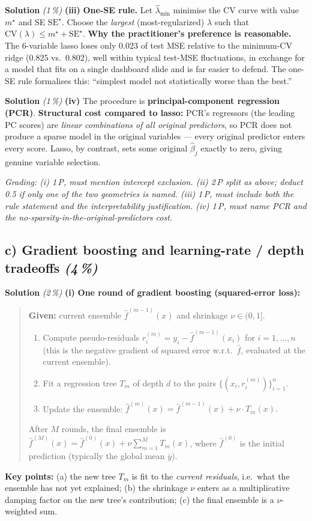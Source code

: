 \documentclass[11pt,a4paper]{article}
\newcommand{\subpoints}[1]{\textit{(#1\,\%)}}
\newcommand{\sol}{\noindent\textbf{Solution}}
\begin{document}
\medskip
\sol{} \subpoints{1} \textbf{(iii)} \textbf{One-SE rule.} Let $\hat\lambda_{\min}$ minimise the CV
curve with value $m^\star$ and SE $\mathrm{SE}^\star$. Choose the \emph{largest} (most-regularized)
$\lambda$ such that $\mathrm{CV}(\lambda) \le m^\star + \mathrm{SE}^\star$.
\textbf{Why the practitioner's preference is reasonable.} The $6$-variable lasso loses only $0.023$
of test MSE relative to the minimum-CV ridge ($0.825$ vs.\ $0.802$), well within typical test-MSE
fluctuations, in exchange for a model that fits on a single dashboard slide and is far easier to
defend. The one-SE rule formalises this: ``simplest model not statistically worse than the best.''

\medskip
\sol{} \subpoints{1} \textbf{(iv)} The procedure is \textbf{principal-component regression (PCR)}.
\textbf{Structural cost compared to lasso:} PCR's regressors (the leading PC scores) are
\emph{linear combinations of all original predictors}, so PCR does not produce a sparse model in
the original variables --- every original predictor enters every score. Lasso, by contrast, sets
some original $\hat\beta_j$ exactly to zero, giving genuine variable selection.

\noindent\emph{Grading: (i) 1\,P, must mention intercept exclusion. (ii) 2\,P split as above; deduct
0.5 if only one of the two geometries is named. (iii) 1\,P, must include both the rule statement
and the interpretability justification. (iv) 1\,P, must name PCR \emph{and} the no-sparsity-in-the-original-predictors
cost.}

\subsection*{c) Gradient boosting and learning-rate / depth tradeoffs \subpoints{4}}

\sol{} \subpoints{2} \textbf{(i)} \textbf{One round of gradient boosting (squared-error loss):}
\begin{quote}\small
\textbf{Given:} current ensemble $\hat f^{(m-1)}(x)$ and shrinkage $\nu \in (0, 1]$.
\begin{enumerate}
  \item Compute pseudo-residuals
        $r_i^{(m)} = y_i - \hat f^{(m-1)}(x_i)$ for $i = 1,\dots,n$
        (this is the negative gradient of squared error w.r.t.\ $\hat f$, evaluated at the current
        ensemble).
  \item Fit a regression tree $T_m$ of depth $d$ to the pairs $\{(x_i, r_i^{(m)})\}_{i=1}^n$.
  \item Update the ensemble:
        $\hat f^{(m)}(x) = \hat f^{(m-1)}(x) + \nu \cdot T_m(x).$
\end{enumerate}
After $M$ rounds, the final ensemble is
$\hat f^{(M)}(x) = \hat f^{(0)}(x) + \nu \sum_{m=1}^M T_m(x)$, where $\hat f^{(0)}$ is the initial
prediction (typically the global mean $\bar y$).
\end{quote}
\textbf{Key points:} (a) the new tree $T_m$ is fit to the \emph{current residuals}, i.e.\ what the
ensemble has not yet explained; (b) the shrinkage $\nu$ enters as a multiplicative damping factor
on the new tree's contribution; (c) the final ensemble is a $\nu$-weighted sum.
\end{document}
